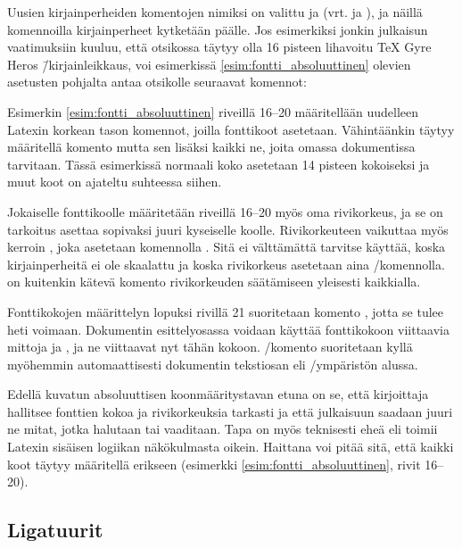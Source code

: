 Uusien kirjainperheiden komentojen nimiksi on valittu  ja  (vrt. 
ja ), ja näillä komennoilla kirjainperheet
kytketään päälle. Jos esimerkiksi jonkin julkaisun vaatimuksiin kuuluu,
että otsikossa täytyy olla 16 pisteen lihavoitu TeX Gyre Heros
\=/kirjainleikkaus, voi esimerkissä \ref{esim:fontti_absoluuttinen}
olevien asetusten pohjalta antaa otsikolle seuraavat komennot:

\begin{koodilohkosis}
  \sffamilyabs\fontsize{16pt}{18pt}\bfseries
\end{koodilohkosis}

Esimerkin \ref{esim:fontti_absoluuttinen} riveillä 16--20 määritellään
uudelleen Latexin korkean tason komennot, joilla fonttikoot asetetaan.
Vähintäänkin täytyy määritellä komento  mutta
sen lisäksi kaikki ne, joita omassa dokumentissa tarvitaan. Tässä
esimerkissä normaali koko asetetaan 14 pisteen kokoiseksi ja muut koot
on ajateltu suhteessa siihen.

Jokaiselle fonttikoolle määritetään riveillä 16--20 myös oma
rivikorkeus, ja se on tarkoitus asettaa sopivaksi juuri kyseiselle
koolle. Rivikorkeuteen vaikuttaa myös kerroin , joka asetetaan komennolla .
Sitä ei välttämättä tarvitse käyttää, koska kirjainperheitä ei ole
skaalattu ja koska rivikorkeus asetetaan aina \-/komennolla.  on kuitenkin kätevä
komento rivikorkeuden säätämiseen yleisesti kaikkialla.

Fonttikokojen määrittelyn lopuksi rivillä 21 suoritetaan komento
, jotta se tulee heti voimaan. Dokumentin
esittely\-osassa voidaan käyttää fonttikokoon viittaavia mittoja
 ja , ja ne viittaavat nyt tähän kokoon.
\-/komento suoritetaan kyllä myöhemmin
automaattisesti dokumentin teksti\-osan eli
\-/ympäristön alussa.

Edellä kuvatun absoluuttisen koonmääritystavan etuna on se, että
kirjoittaja hallitsee fonttien kokoa ja rivikorkeuksia tarkasti ja että
julkaisuun saadaan juuri ne mitat, jotka halutaan tai vaaditaan. Tapa on
myös teknisesti eheä eli toimii Latexin sisäisen logiikan näkökulmasta
oikein. Haittana voi pitää sitä, että kaikki koot täytyy määritellä
erikseen (esimerkki \ref{esim:fontti_absoluuttinen}, rivit 16--20).

\subsection{Ligatuurit}
